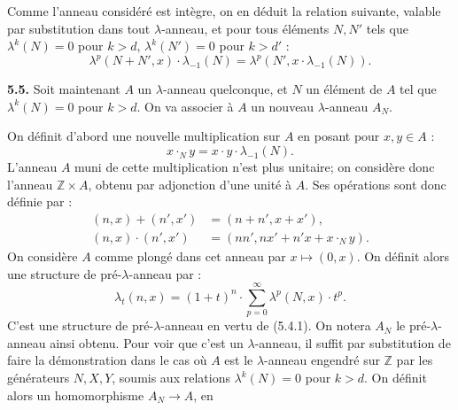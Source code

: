 Comme l'anneau considéré est intègre, on en déduit la relation suivante, valable par substitution dans tout \(\lambda\)-anneau, et pour tous éléments \(N,N'\) tels que \(\lambda^k(N)=0\) pour \(k>d\), \(\lambda^k(N')=0\) pour \(k>d'\) :
\begin{equation}\tag{5.4.2}
  \lambda^p(N+N',x)\cdot\lambda_{-1}(N)=\lambda^p(N',x\cdot\lambda_{-1}(N)).
\end{equation}


\textbf{5.5.} Soit maintenant \(A\) un \(\lambda\)-anneau quelconque, et \(N\) un élément de \(A\) tel que \(\lambda^k(N)=0\) pour \(k>d\). On va associer à \(A\) un nouveau \(\lambda\)-anneau \(A_N\).

On définit d'abord une nouvelle multiplication sur \(A\) en posant pour \(x,y\in A\) :
\begin{equation}\tag{5.5.1}
  x\cdot_N y=x\cdot y\cdot\lambda_{-1}(N).
\end{equation}
L'anneau \(A\) muni de cette multiplication n'est plus unitaire; on considère donc l'anneau \(\mathbb Z\times A\), obtenu par adjonction d'une unité à \(A\). Ses opérations sont donc définie par :
\begin{equation}\tag{5.5.2}
\begin{aligned}
  (n,x)+(n',x')&=(n+n',x+x'),\\
  (n,x)\cdot(n',x')&=(nn',nx'+n'x+x\cdot_N y).
\end{aligned}
\end{equation}
On considère \(A\) comme plongé dans cet anneau par \(x\mapsto(0,x)\). On définit alors une structure de pré-\(\lambda\)-anneau par :
\begin{equation}\tag{5.5.3}
  \lambda_t(n,x)=(1+t)^n\cdot\sum_{p=0}^{\infty}\lambda^p(N,x)\cdot t^p.
\end{equation}
C'est une structure de pré-\(\lambda\)-anneau en vertu de (5.4.1). On notera \(A_N\) le pré-\(\lambda\)-anneau ainsi obtenu. Pour voir que c'est un \(\lambda\)-anneau, il suffit par substitution de faire la démonstration dans le cas où \(A\) est le \(\lambda\)-anneau engendré sur \(\mathbb Z\) par les générateurs \(N,X,Y\), soumis aux relations \(\lambda^k(N)=0\) pour \(k>d\). On définit alors un homomorphisme \(A_N\to A\), en
